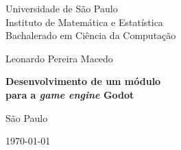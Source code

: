 \thispagestyle{empty}
\begin{center}
    \vspace*{2.3cm}
    Universidade de São Paulo\\
    Instituto de Matemática e Estatística\\
    Bachalerado em Ciência da Computação


    \vspace*{3cm}
    \Large{Leonardo Pereira Macedo}


    \vspace{3cm}
    \textbf{\Large{Desenvolvimento de um módulo\\
    para a \textit{game engine} Godot}}


    \vskip 5cm
    \normalsize{São Paulo}

    \today
\end{center}

